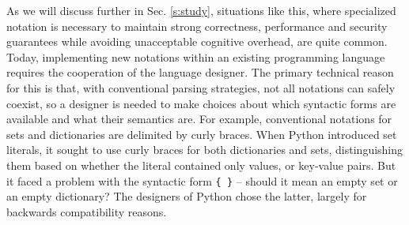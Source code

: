 %
As we will discuss further in Sec. \ref{s:study}, situations like this, where specialized notation is  necessary to maintain strong correctness, performance and security guarantees while avoiding unacceptable cognitive overhead, are quite common. 
Today, implementing new notations within an existing programming language requires the cooperation of the language designer. The primary technical reason for this is that, with conventional parsing strategies, not all notations can safely coexist, so a designer is needed to make choices about which syntactic forms are available and what their semantics are. For example, conventional notations for sets and dictionaries are delimited by curly braces. When Python introduced set literals, it sought to use curly braces for both dictionaries and sets, distinguishing them based on whether the literal contained only values, or key-value pairs. But it faced a problem with the syntactic form \verb|{ }| -- should it mean an empty set or an empty dictionary? The designers of Python chose the latter, largely for backwards compatibility reasons.

